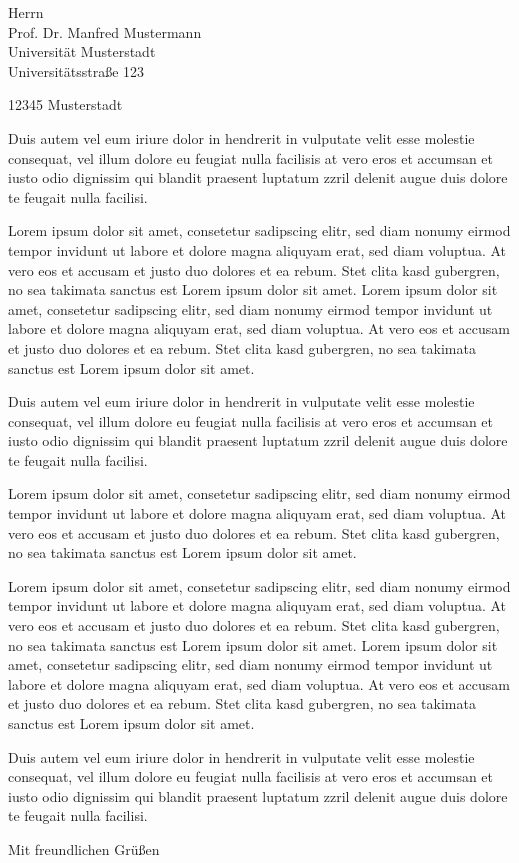 \documentclass[foldmarks,rightdate,twoside,a4paper]{hhuletter}
\begin{document}
\begin{letter}{Herrn\\
Prof. Dr. Manfred Mustermann\\
Universität Musterstadt\\
Universitätsstraße 123

12345 Musterstadt}
Duis autem vel eum iriure dolor in hendrerit in vulputate velit esse
molestie consequat, vel illum dolore eu feugiat nulla facilisis at vero eros
et accumsan et iusto odio dignissim qui blandit praesent luptatum zzril
delenit augue duis dolore te feugait nulla facilisi. 

Lorem ipsum dolor sit amet, consetetur sadipscing elitr, sed diam nonumy
eirmod tempor invidunt ut labore et dolore magna aliquyam erat, sed diam
voluptua. At vero eos et accusam et justo duo dolores et ea rebum. Stet
clita kasd gubergren, no sea takimata sanctus est Lorem ipsum dolor sit
amet. Lorem ipsum dolor sit amet, consetetur sadipscing elitr, sed diam
nonumy eirmod tempor invidunt ut labore et dolore magna aliquyam erat, sed
diam voluptua. At vero eos et accusam et justo duo dolores et ea rebum. Stet
clita kasd gubergren, no sea takimata sanctus est Lorem ipsum dolor sit
amet.   

Duis autem vel eum iriure dolor in hendrerit in vulputate velit esse
molestie consequat, vel illum dolore eu feugiat nulla facilisis at vero eros
et accumsan et iusto odio dignissim qui blandit praesent luptatum zzril
delenit augue duis dolore te feugait nulla facilisi. 


Lorem ipsum dolor sit amet, consetetur sadipscing elitr, sed diam nonumy
eirmod tempor invidunt ut labore et dolore magna aliquyam erat, sed diam
voluptua. At vero eos et accusam et justo duo dolores et ea rebum. Stet
clita kasd gubergren, no sea takimata sanctus est Lorem ipsum dolor sit
amet. 

Lorem ipsum dolor sit amet, consetetur sadipscing elitr, sed diam nonumy
eirmod tempor invidunt ut labore et dolore magna aliquyam erat, sed diam
voluptua. At vero eos et accusam et justo duo dolores et ea rebum. Stet
clita kasd gubergren, no sea takimata sanctus est Lorem ipsum dolor sit
amet. Lorem ipsum dolor sit amet, consetetur sadipscing elitr, sed diam
nonumy eirmod tempor invidunt ut labore et dolore magna aliquyam erat, sed
diam voluptua. At vero eos et accusam et justo duo dolores et ea rebum. Stet
clita kasd gubergren, no sea takimata sanctus est Lorem ipsum dolor sit
amet.   

Duis autem vel eum iriure dolor in hendrerit in vulputate velit esse
molestie consequat, vel illum dolore eu feugiat nulla facilisis at vero eros
et accumsan et iusto odio dignissim qui blandit praesent luptatum zzril
delenit augue duis dolore te feugait nulla facilisi. 


\closing{Mit freundlichen Grüßen}

\end{letter}
\end{document}
